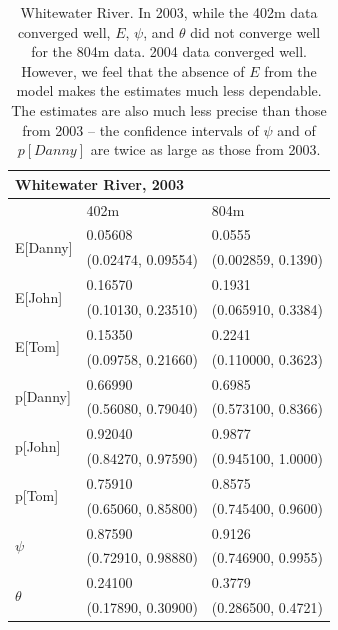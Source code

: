 \documentclass[12pt]{article}
\begin{document}
    \begin{table}
    \caption{Whitewater River. In 2003, while the 402m data converged well,
    \(E\), \(\psi\), and \(\theta\) did not converge well for the 804m data.
    2004 data converged well. However, we feel that the absence of \(E\) from
    the model makes the estimates much less dependable. The estimates are also
    much less precise than those from 2003 -- the confidence intervals of
    \(\psi\) and of \(p[Danny]\) are twice as large as those from 2003.}
    \label{Whitewater}
    \begin{center}
    \begin{tabular}{|l|l|l|}
        \hline
        \multicolumn{3}{|l|}{\textbf{Whitewater River, 2003}} \\
        \hline
            & 402m & 804m \\
        \hline
        \multirow{2}{*}{E[Danny]}
            & 0.05608 & 0.0555 \\
            & (0.02474, 0.09554) & (0.002859, 0.1390) \\
        \hline
        \multirow{2}{*}{E[John]}
            & 0.16570 & 0.1931 \\
            & (0.10130, 0.23510) & (0.065910, 0.3384) \\
        \hline
        \multirow{2}{*}{E[Tom]}
            & 0.15350 & 0.2241 \\
            & (0.09758, 0.21660) & (0.110000, 0.3623) \\
        \hline
        \multirow{2}{*}{p[Danny]}
            & 0.66990 & 0.6985 \\
            & (0.56080, 0.79040) & (0.573100, 0.8366) \\
        \hline
        \multirow{2}{*}{p[John]}
            & 0.92040 & 0.9877 \\
            & (0.84270, 0.97590) & (0.945100, 1.0000) \\
        \hline
        \multirow{2}{*}{p[Tom]}
            & 0.75910 & 0.8575 \\
            & (0.65060, 0.85800) & (0.745400, 0.9600) \\
        \hline
        \multirow{2}{*}{\(\psi\)}
            & 0.87590 & 0.9126 \\
            & (0.72910, 0.98880) & (0.746900, 0.9955) \\
        \hline
        \multirow{2}{*}{\(\theta\)}
            & 0.24100 & 0.3779 \\
            & (0.17890, 0.30900) & (0.286500, 0.4721) \\
        \hline
    \end{tabular}
    \end{center}


\end{table}
\end{document}
